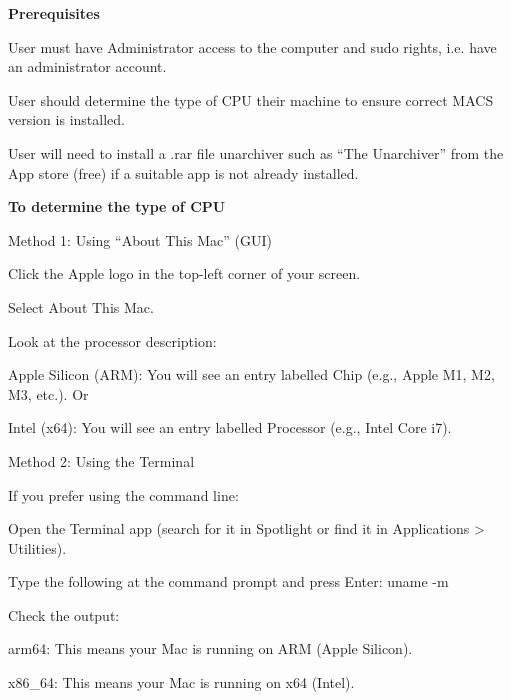 \textbf{Prerequisites}

\begin{compactenum}
    \item User must have Administrator access to the computer and sudo rights, i.e. have an administrator account.
    \item User should determine the type of CPU their machine to ensure correct MACS version is installed.
    \item User will need to install a .rar file unarchiver such as “The Unarchiver” from the App store (free) if a suitable app is not already installed.
\end{compactenum}

\textbf{To determine the type of CPU}

Method 1: Using “About This Mac” (GUI)

\begin{compactenum}
    \item Click the Apple logo in the top-left corner of your screen.
    \item Select About This Mac.
    \item Look at the processor description:
    \begin{compactitem}
        \item Apple Silicon (ARM): You will see an entry labelled Chip (e.g., Apple M1, M2, M3, etc.). Or
        \item Intel (x64): You will see an entry labelled Processor (e.g., Intel Core i7).
    \end{compactitem}
\end{compactenum}

Method 2: Using the Terminal

If you prefer using the command line:

\begin{compactenum}
    \item Open the Terminal app (search for it in Spotlight or find it in Applications > Utilities).
    \item Type the following at the command prompt and press Enter: uname -m
    \item Check the output:
    \begin{compactitem}
        \item arm64: This means your Mac is running on ARM (Apple Silicon).
        \item x86\_64: This means your Mac is running on x64 (Intel).
    \end{compactitem}
\end{compactenum}

